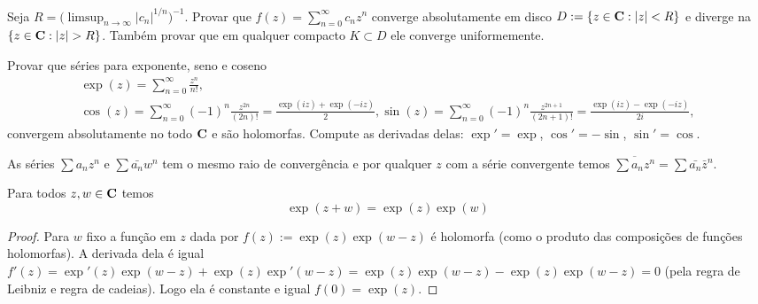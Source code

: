 \begin{problema}
Seja $R = \big(\limsup_{n\to\infty} |c_n|^{1/n}\big)^{-1}$. Provar que $f(z) = \sum_{n=0}^\infty c_n z^n$
converge absolutamente em disco $D := \{z\in\mathbf{C}: |z|<R\}$ e diverge na $\{z\in\mathbf{C}: |z| >R\}$.
Também provar que em qualquer compacto $K\subset D$ ele converge uniformemente.
\end{problema}

\begin{problema}
Provar que séries para exponente, seno e coseno
\begin{multline}
\exp(z) = \sum_{n=0}^\infty \frac{z^n}{n!}, \\
\cos(z) = \sum_{n=0}^\infty (-1)^n \frac{z^{2n}}{(2n)!} = \frac{\exp(iz) + \exp(-iz)}{2},
\sin(z) = \sum_{n=0}^\infty (-1)^n \frac{z^{2n+1}}{(2n+1)!} = \frac{\exp(iz) - \exp(-iz)}{2i},
\end{multline}
convergem absolutamente no todo $\mathbf{C}$ e são holomorfas.
Compute as derivadas delas:
$\exp' = \exp$, $\cos' = -\sin$, $\sin' = \cos$.
\end{problema}

As séries $\sum a_n z^n$ e $\sum \bar{a_n} w^n$ tem o mesmo raio de convergência e por qualquer $z$ com a série convergente temos
$\overline{\sum a_n z^n} = \sum \bar{a_n} \bar{z}^n$.

\begin{prop}
Para todos $z,w\in \mathbf{C}$ temos
\begin{equation}
\exp(z+w) = \exp(z) \exp(w)
\end{equation}
\end{prop}
\begin{proof}
Para $w$ fixo a função em $z$ dada por
$f(z) := \exp(z) \exp(w-z)$ é holomorfa (como o produto das composições de funções holomorfas).
A derivada dela é igual $f'(z) = \exp'(z) \exp(w-z) + \exp(z) \exp'(w-z) = \exp(z) \exp(w-z) - \exp(z) \exp(w-z) = 0$
(pela regra de Leibniz e regra de cadeias). Logo ela é constante e igual $f(0) = \exp(z)$.
\end{proof}

